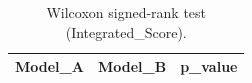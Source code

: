 \begin{table}[t]
\centering
\begin{tabular}{lll}
\toprule
Model_A & Model_B & p_value \\
\midrule
\bottomrule
\end{tabular}
\caption{Wilcoxon signed-rank test (Integrated_Score).}
\label{tab:wilcoxon_Integrated_Score}
\end{table}